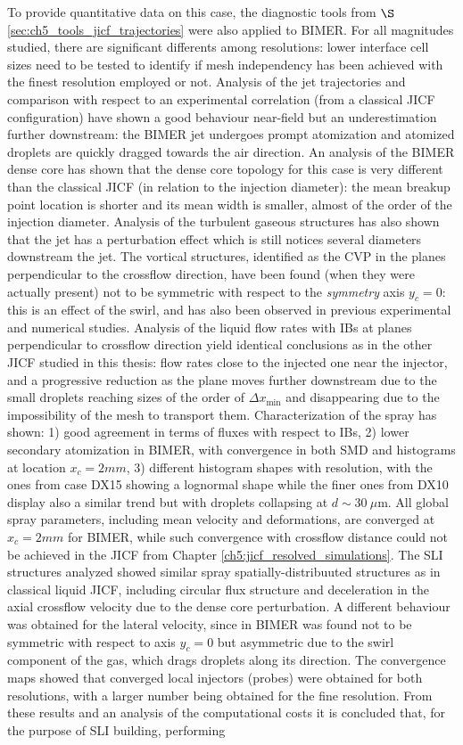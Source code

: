 To provide quantitative data on this case, the diagnostic tools from $\S$\ref{sec:ch5_tools_jicf_trajectories} were also applied to BIMER. For all magnitudes studied, there are significant differents among resolutions: lower interface cell sizes need to be tested to identify if mesh independency has been achieved with the finest resolution employed or not. Analysis of the jet trajectories and comparison with respect to an experimental correlation (from a classical JICF configuration) have shown a good behaviour near-field but an underestimation further downstream: the BIMER jet undergoes prompt atomization and atomized droplets are quickly dragged towards the air direction. An analysis of the BIMER dense core has shown that the dense core topology for this case is very different than the classical JICF (in relation to the injection diameter): the mean breakup point location is shorter and its mean width is smaller, almost of the order of the injection diameter. Analysis of the turbulent gaseous structures has also shown that the jet has a perturbation effect which is still notices several diameters downstream the jet. The vortical structures, identified as the CVP in the planes perpendicular to the crossflow direction, have been found (when they were actually present) not to be symmetric with respect to the \textsl{symmetry} axis $y_c = 0$: this is an effect of the swirl, and has also been observed in previous experimental and numerical studies. Analysis of the liquid flow rates with IBs at planes perpendicular to crossflow direction yield identical conclusions as in the other JICF studied in this thesis: flow rates close to the injected one near the injector, and a progressive reduction as the plane moves further downstream due to the small droplets reaching sizes of the order of  $\Delta x_\mathrm{min}$ and disappearing due to the impossibility of the mesh to transport them. Characterization of the spray has shown: 1) good agreement in terms of fluxes with respect to IBs, 2) lower secondary atomization in BIMER, with convergence in both SMD and histograms at location $x_c = 2 mm$, 3) different histogram shapes with resolution, with the ones from case DX15 showing a lognormal shape while the finer ones from DX10 display also a similar trend but with droplets collapsing at $d \sim 30~\mu$m. All global spray parameters, including mean velocity and deformations, are converged at $x_c = 2 mm$ for BIMER, while such convergence with crossflow distance could not be achieved in the JICF from Chapter \ref{ch5:jicf_resolved_simulations}. The SLI structures analyzed showed similar spray spatially-distribuuted structures as in classical liquid JICF, including circular flux structure and deceleration in the axial crossflow velocity due to the dense core perturbation. A different behaviour was obtained for the lateral velocity, since in BIMER was found not to be symmetric with respect to axis $y_c = 0$ but asymmetric due to the swirl component of the gas, which drags droplets along its direction. The convergence maps showed that converged local injectors (probes) were obtained for both resolutions, with a larger number being obtained for the fine resolution. From these results and an analysis of the computational costs it is concluded that, for the purpose of SLI building, performing 